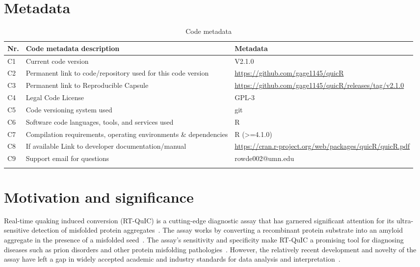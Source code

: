\documentclass[preprint,12pt, a4paper]{elsarticle}
\begin{document}

\section*{Metadata}

\begin{table}[ht]
    \fontsize{9}{9}\selectfont
    \begin{tabular}{|l|p{6.5cm}|p{6.5cm}|}
        \hline{}
        \textbf{Nr.} & \textbf{Code metadata description} & \textbf{Metadata} \\
        \hline{}
        C1 & Current code version & V2.1.0 \\
        \hline{}
        C2 & Permanent link to code/repository used for this code version & \url{https://github.com/gage1145/quicR} \\
        \hline{}
        C3  & Permanent link to Reproducible Capsule & \url{https://github.com/gage1145/quicR/releases/tag/v2.1.0}\\
        \hline{}
        C4 & Legal Code License & GPL-3 \\
        \hline{}
        C5 & Code versioning system used & git \\
        \hline{}
        C6 & Software code languages, tools, and services used & R \\
        \hline{}
        C7 & Compilation requirements, operating environments \& dependencies & R (>=4.1.0) \\
        \hline{}
        C8 & If available Link to developer documentation/manual & \url{https://cran.r-project.org/web/packages/quicR/quicR.pdf}\\
        \hline{}
        C9 & Support email for questions & rowde002@umn.edu\\
        \hline{}
    \end{tabular}
\caption{Code metadata}
\label{codeMetadata} 
\end{table}


\section{Motivation and significance}
    Real-time quaking induced conversion (RT-QuIC) is a cutting-edge diagnostic assay that has garnered significant attention for its ultra-sensitive detection of misfolded protein aggregates~\cite{Wilham2010, Atarashi2011}. The assay works by converting a recombinant protein substrate into an amyloid aggregate in the presence of a misfolded seed~\cite{Wilham2010, Orru2012, Orru2017, Orru2015, Bongianni2019, Dassanayake2016, Hwang2018, Groveman2018, Metrick2020}. The assay's sensitivity and specificity make RT-QuIC a promising tool for diagnosing diseases such as prion disorders and other protein misfolding pathologies~\cite{Fiorini2020, Franceschini2017, Picasso-Risso2022, Holz2021}. However, the relatively recent development and novelty of the assay have left a gap in widely accepted academic and industry standards for data analysis and interpretation~\cite{Rowden2023}.
\end{document}
